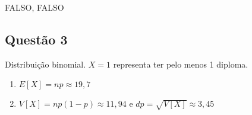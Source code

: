 \documentclass[
]{article}
\begin{document}
FALSO, FALSO

\hypertarget{questuxe3o-3-1}{%
\subsection{Questão 3}\label{questuxe3o-3-1}}

Distribuição binomial. \(X=1\) representa ter pelo menos 1 diploma.

\begin{enumerate}
\def\labelenumi{\alph{enumi})}
\item
  \(E[X]=np \approx 19,7\)
\item
  \(V[X]=np(1-p)\approx 11,94\) e \(dp=\sqrt{V[X]} \approx 3,45\)
\end{enumerate}
\end{document}
